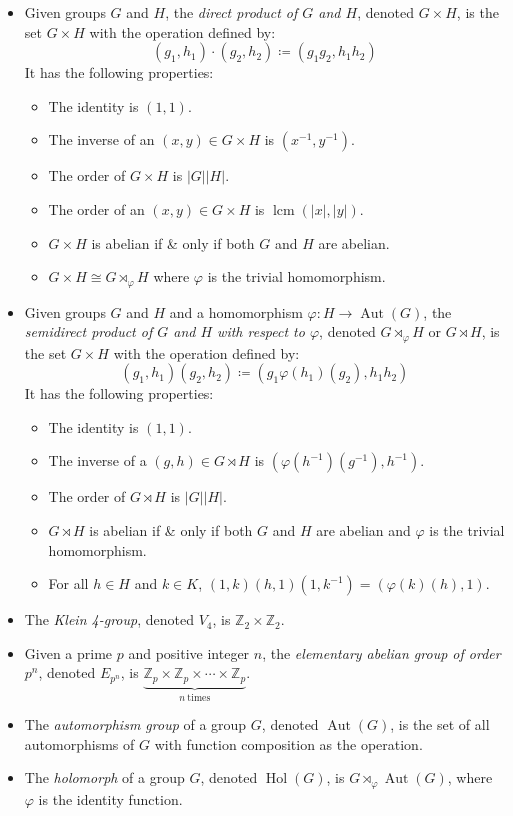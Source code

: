 \documentclass{article}
\newcommand{\Z}{\mathbb{Z}}
\DeclareMathOperator{\lcm}{lcm}
\DeclareMathOperator{\Aut}{Aut}
\begin{document}
\begin{itemize}
\item Given groups $G$ and $H$, the \emph{direct product of $G$ and $H$}, denoted $G\times H$, is the set $G\times H$ with the operation defined by: $$(g_1, h_1)\cdot(g_2, h_2)\coloneqq (g_1g_2, h_1h_2)$$  It has the following properties:
 \begin{itemize}
 \item The identity is $(1,1)$.
 \item The inverse of an $(x,y)\in G\times H$ is $(x^{-1}, y^{-1})$.
 \item The order of $G\times H$ is $|G| |H|$.
 \item The order of an $(x,y)\in G\times H$ is $\lcm(|x|, |y|)$.
 \item $G\times H$ is abelian if \& only if both $G$ and $H$ are abelian.
 \item $G\times H \cong G\rtimes_\varphi H$ where $\varphi$ is the trivial homomorphism.
 \end{itemize}

\item Given groups $G$ and $H$ and a homomorphism $\varphi\colon H\to\Aut(G)$, the \emph{semidirect product of $G$ and $H$ with respect to $\varphi$}, denoted $G\rtimes_\varphi H$ or $G\rtimes H$, is the set $G\times H$ with the operation defined by: $$(g_1, h_1)(g_2, h_2) \coloneqq (g_1\varphi(h_1)(g_2), h_1h_2)$$  It has the following properties:
 \begin{itemize}
 \item The identity is $(1,1)$.
 \item The inverse of a $(g,h)\in G\rtimes H$ is $(\varphi(h^{-1})(g^{-1}), h^{-1})$.
 \item The order of $G\rtimes H$ is $|G| |H|$.
 \item $G\rtimes H$ is abelian if \& only if both $G$ and $H$ are abelian and $\varphi$ is the trivial homomorphism.
 \item For all $h\in H$ and $k\in K$, $(1,k)(h,1)(1, k^{-1}) = (\varphi(k)(h), 1)$.
 \end{itemize}

\item The \emph{Klein 4-group}, denoted $V_4$, is $\Z_2\times\Z_2$.
\item Given a prime $p$ and positive integer $n$, the \emph{elementary abelian group of order $p^n$}, denoted $E_{p^n}$, is $\underbrace{\Z_p\times\Z_p\times\cdots\times\Z_p}_{n\ \mathrm{times}}$.
\item The \emph{automorphism group} of a group $G$, denoted $\Aut(G)$, is the set of all automorphisms of $G$ with function composition as the operation.
\item The \emph{holomorph} of a group $G$, denoted $\operatorname{Hol}(G)$, is $G\rtimes_\varphi\Aut(G)$, where $\varphi$ is the identity function.


\end{itemize}
\end{document}
